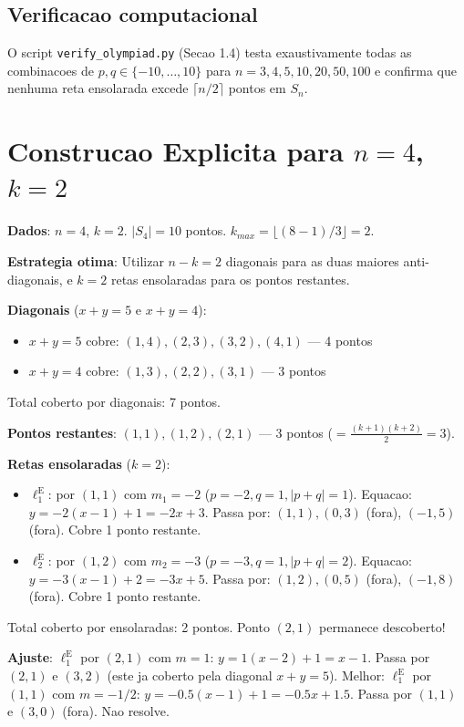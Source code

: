 \documentclass[5p]{elsarticle}
\theoremstyle{definition}
\begin{document}
\subsection{Verificacao computacional}

O script \texttt{verify\_olympiad.py} (Secao 1.4) testa exaustivamente todas as
combinacoes de $p,q \in \{-10,\dots,10\}$ para $n = 3, 4, 5, 10, 20, 50, 100$ e
confirma que nenhuma reta ensolarada excede $\lceil n/2 \rceil$ pontos em $S_n$.

\section{Construcao Explicita para $n=4$, $k=2$}\label{app:construcao}

\textbf{Dados}: $n=4$, $k=2$. $|S_4| = 10$ pontos. $k_{max} = \lfloor(8-1)/3\rfloor = 2$.

\textbf{Estrategia otima}: Utilizar $n-k = 2$ diagonais para as duas maiores
anti-diagonais, e $k = 2$ retas ensolaradas para os pontos restantes.

\textbf{Diagonais} ($x+y = 5$ e $x+y = 4$):
\begin{itemize}
  \item $x+y=5$ cobre: $(1,4), (2,3), (3,2), (4,1)$ — 4 pontos
  \item $x+y=4$ cobre: $(1,3), (2,2), (3,1)$ — 3 pontos
\end{itemize}
Total coberto por diagonais: 7 pontos.

\textbf{Pontos restantes}: $(1,1), (1,2), (2,1)$ — 3 pontos ($= \frac{(k+1)(k+2)}{2} = 3$).

\textbf{Retas ensolaradas} ($k=2$):
\begin{itemize}
  \item $\ell_1^{\text{E}}$: por $(1,1)$ com $m_1 = -2$ ($p=-2, q=1, |p+q|=1$).
    Equacao: $y = -2(x-1)+1 = -2x+3$.
    Passa por: $(1,1), (0,3)$ (fora), $(-1,5)$ (fora). Cobre 1 ponto restante.
  \item $\ell_2^{\text{E}}$: por $(1,2)$ com $m_2 = -3$ ($p=-3, q=1, |p+q|=2$).
    Equacao: $y = -3(x-1)+2 = -3x+5$.
    Passa por: $(1,2), (0,5)$ (fora), $(-1,8)$ (fora). Cobre 1 ponto restante.
\end{itemize}

Total coberto por ensolaradas: 2 pontos. Ponto $(2,1)$ permanece descoberto!

\textbf{Ajuste}: $\ell_1^{\text{E}}$ por $(2,1)$ com $m=1$:
$y = 1(x-2)+1 = x-1$. Passa por $(2,1)$ e $(3,2)$ (este ja coberto pela diagonal
$x+y=5$). Melhor: $\ell_1^{\text{E}}$ por $(1,1)$ com $m = -1/2$:
$y = -0.5(x-1)+1 = -0.5x+1.5$. Passa por $(1,1)$ e $(3,0)$ (fora). Nao resolve.
\end{document}
